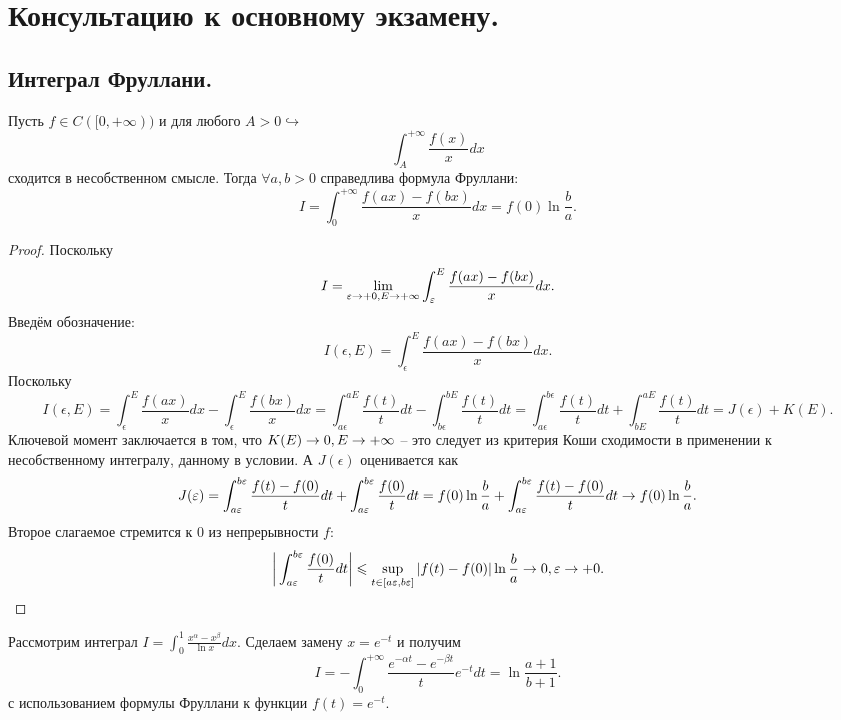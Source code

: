 \section{Консультацию к основному экзамену.}
\subsection{Интеграл Фруллани.}
\begin{lemma}
    Пусть $f \in C([0, +\infty))$ и для любого $A > 0 \hookrightarrow$
    \[
        \int_A^{+\infty} \dfrac{f(x)}{x}dx
    \]
    сходится в несобственном смысле.
    Тогда $\forall a, b > 0$ справедлива формула Фруллани:
    \[
        I = \int_0^{+\infty} \frac{f(ax) - f(bx)}{x}dx = f(0)\ln \frac{b}{a}.
    \]
\end{lemma}
\begin{proof}
    Поскольку
    \[
        I = \lim\limits_{\varepsilon \rightarrow +0, E \rightarrow +\infty} \int_{\varepsilon}^{E} \dfrac{f(ax) - f(bx)}{x}dx.
    \]
    Введём обозначение:
    \[
        I(\epsilon, E) = \int_{\epsilon}^{E} \dfrac{f(ax) - f(bx)}{x}dx.
    \]
    Поскольку
    \[
        I(\epsilon, E) = \int_{\epsilon}^E \dfrac{f(ax)}{x}dx - \int_{\epsilon}^{E} \dfrac{f(bx)}{x}dx = \int_{a\epsilon}^{aE} \dfrac{f(t)}{t}dt - \int_{b\epsilon}^{bE} \dfrac{f(t)}{t}dt = \int_{a\epsilon}^{b\epsilon} \dfrac{f(t)}{t}dt + \int_{bE}^{aE} \dfrac{f(t)}{t}dt = J(\epsilon) + K(E).
    \]
    Ключевой момент заключается в том, что $K(E) \rightarrow 0, E \rightarrow +\infty$ -- это следует из критерия Коши сходимости в применении к несобственному интегралу, данному в условии.
    А $J(\epsilon)$ оценивается как
    \[
        J(\varepsilon) = \int_{a\varepsilon}^{b\varepsilon} \dfrac{f(t) - f(0)}{t}dt + \int_{a \varepsilon}^{b\varepsilon} \dfrac{f(0)}{t}dt = f(0) \ln \frac{b}{a} + \int_{a\varepsilon}^{b\varepsilon} \dfrac{f(t) - f(0)}{t}dt \rightarrow f(0) \ln \frac{b}{a}.
    \]
    Второе слагаемое стремится к 0 из непрерывности $f$:
    \[
        \biggr|\int_{a \varepsilon}^{b\varepsilon} \dfrac{f(0)}{t}dt \biggr| \leqslant \sup\limits_{t \in [a\varepsilon, b \varepsilon]}|f(t) - f(0)| \ln \frac{b}{a} \rightarrow 0, \varepsilon \rightarrow +0.
    \]
\end{proof}
\begin{example}
    Рассмотрим интеграл $I = \int_0^1 \frac{x^\alpha - x^\beta}{\ln x}dx$.
    Сделаем замену $x = e^{-t}$ и получим
    \[
        I = -\int_0^{+\infty} \dfrac{e^{-\alpha t} - e^{-\beta t}}{t} e^{-t}dt = \ln \dfrac{a + 1}{b + 1}.
    \]
    с использованием формулы Фруллани к функции $f(t) = e^{-t}$.
\end{example}
